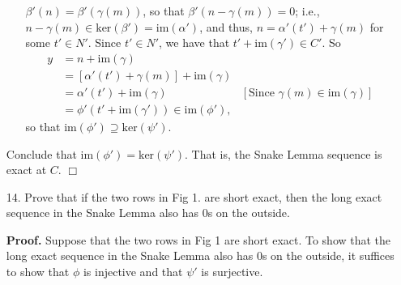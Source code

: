 \documentclass[9pt]{article}
\newcommand{\qed}{\hfill \ensuremath{\Box}}
\begin{document}
\begin{enumerate}
\begin{itemize}
               $\beta'(n) = \beta'(\gamma(m))$, so that
               $\beta'(n - \gamma(m)) = 0$; i.e.,
               $n - \gamma(m) \in \text{ker}(\beta') = \text{im}(\alpha')$, and
               thus, $n = \alpha'(t') + \gamma(m)$ for some $t' \in N'$. Since
               $t' \in N'$, we have that $t' + \text{im}(\gamma') \in C'$. So
               \begin{align*}
                  y &= n + \text{im}(\gamma) \\
                    &= [\alpha'(t') + \gamma(m)] + \text{im}(\gamma) \\
                    &= \alpha'(t') + \text{im}(\gamma) &[\text{Since }\gamma(m)
                          \in \text{im}(\gamma)] \\
                    &= \phi'(t' + \text{im}(\gamma')) \in \text{im}(\phi'),
               \end{align*}
               so that $\text{im}(\phi') \supseteq \text{ker}(\psi')$.
      \end{itemize}
      Conclude that $\text{im}(\phi') = \text{ker}(\psi')$. That is, the Snake
      Lemma sequence is exact at $C$. \qed
   \item[14.]  Prove that if the two rows in Fig 1. are short exact, then the
               long exact sequence in the Snake Lemma also has 0s on the
               outside.

      \textbf{Proof.} Suppose that the two rows in Fig 1 are short exact. To
      show that the long exact sequence in the Snake Lemma also has 0s on the
      outside, it suffices to show that $\phi$ is injective and that $\psi'$ is
      surjective.


\end{enumerate}
\end{document}

